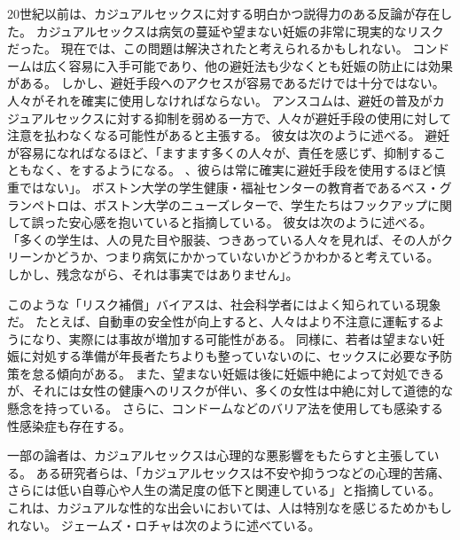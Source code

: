 \documentclass[paper=a4,book,openany]{jlreq}
\begin{document}
20世紀以前は、カジュアルセックスに対する明白かつ説得力のある反論が存在した。
カジュアルセックスは病気の蔓延や望まない妊娠の非常に現実的なリスクだった。
現在では、この問題は解決されたと考えられるかもしれない。
コンドームは広く容易に入手可能であり、他の避妊法も少なくとも妊娠の防止には効果がある。
しかし、避妊手段へのアクセスが容易であるだけでは十分ではない。
人々がそれを確実に使用しなければならない。
アンスコムは、避妊の普及がカジュアルセックスに対する抑制を弱める一方で、人々が避妊手段の使用に対して注意を払わなくなる可能性があると主張する。
彼女は次のように述べる。
避妊が容易になればなるほど、「ますます多くの人々が、責任を感じず、抑制することもなく、をするようになる。
、彼らは常に確実に避妊手段を使用するほど慎重ではない」\citep[p. 146]{anscombe72contraception}。
ボストン大学の学生健康・福祉センターの教育者であるベス・グランペトロは、ボストン大学のニューズレターで、学生たちはフックアップに関して誤った安心感を抱いていると指摘している。
彼女は次のように述べる。
「多くの学生は、人の見た目や服装、つきあっている人々を見れば、その人がクリーンかどうか、つまり病気にかかっていないかどうかわかると考えている。
しかし、残念ながら、それは事実ではありません」\citep{noa07:_prob_hook_up}。

このような「リスク補償」バイアスは、社会科学者にはよく知られている現象だ。
たとえば、自動車の安全性が向上すると、人々はより不注意に運転するようになり、実際には事故が増加する可能性がある。
同様に、若者は望まない妊娠に対処する準備が年長者たちよりも整っていないのに、セックスに必要な予防策を怠る傾向がある。
また、望まない妊娠は後に妊娠中絶によって対処できるが、それには女性の健康へのリスクが伴い、多くの女性は中絶に対して道徳的な懸念を持っている。
さらに、コンドームなどのバリア法を使用しても感染する性感染症も存在する。

一部の論者は、カジュアルセックスは心理的な悪影響をもたらすと主張している。
ある研究者らは、「カジュアルセックスは不安や抑うつなどの心理的苦痛、さらには低い自尊心や人生の満足度の低下と関連している」と指摘している\citep{napper16:_asses_pers_negat}。
これは、カジュアルな性的な出会いにおいては、人は特別なを感じるためかもしれない。
ジェームズ・ロチャは次のように述べている。
\end{document}
